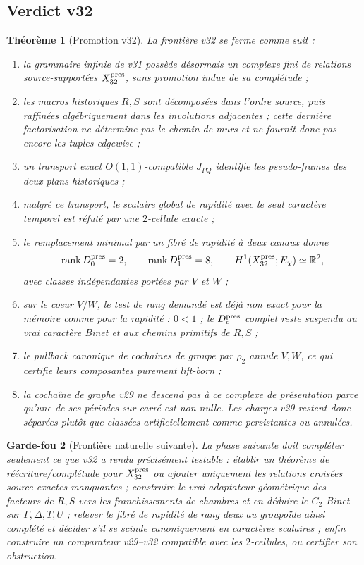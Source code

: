 \documentclass[11pt,a4paper]{article}
\newtheorem{theorem}{Théorème}[section]
\newtheorem{guardrail}[theorem]{Garde-fou}
\newcommand{\rank}{\operatorname{rank}}
\begin{document}
\subsection{Verdict v32}

\begin{theorem}[Promotion v32]\label{thm:v32-verdict}
La frontière v32 se ferme comme suit :
\begin{enumerate}[label=\textup{(\roman*)}]
\item la grammaire infinie de v31 possède désormais un complexe fini de relations source-supportées
$X_{32}^{\rm pres}$, sans promotion indue de sa complétude ;
\item les macros historiques $R,S$ sont décomposées dans l'ordre source, puis raffinées
algébriquement dans les involutions adjacentes ; cette dernière factorisation ne détermine pas le
chemin de murs et ne fournit donc pas encore les tuples edgewise ;
\item un transport exact $O(1,1)$-compatible $J_{PQ}$ identifie les pseudo-frames des deux plans
historiques ;
\item malgré ce transport, le scalaire global de rapidité avec le seul caractère temporel est
réfuté par une $2$-cellule exacte ;
\item le remplacement minimal par un fibré de rapidité à deux canaux donne
\[
 \rank D_0^{\rm pres}=2,\qquad
 \rank D_1^{\rm pres}=8,\qquad
 H^1(X_{32}^{\rm pres};E_\chi)\simeq\mathbb R^2,
\]
avec classes indépendantes portées par $V$ et $W$ ;
\item sur le coeur $V/W$, le test de rang demandé est déjà non exact pour la mémoire comme pour
la rapidité : $0<1$ ; le $D_c^{\rm pres}$ complet reste suspendu au vrai caractère Binet et aux
chemins primitifs de $R,S$ ;
\item le pullback canonique de cochaînes de groupe par $\rho_2$ annule $V,W$, ce qui certifie leurs
composantes purement lift-born ;
\item la cochaîne de graphe v29 ne descend pas à ce complexe de présentation parce qu'une de ses
périodes sur carré est non nulle. Les charges v29 restent donc séparées plutôt que classées
artificiellement comme persistantes ou annulées.
\end{enumerate}
\end{theorem}

\begin{guardrail}[Frontière naturelle suivante]
La phase suivante doit compléter seulement ce que v32 a rendu précisément testable : établir un
théorème de réécriture/complétude pour $X_{32}^{\rm pres}$ ou ajouter uniquement les relations
croisées source-exactes manquantes ; construire le vrai adaptateur géométrique des facteurs de
$R,S$ vers les franchissements de chambres et en déduire le $C_2$ Binet sur
$\Gamma,\Delta,T,U$ ; relever le fibré de rapidité de rang deux au groupoïde ainsi complété et
décider s'il se scinde canoniquement en caractères scalaires ; enfin construire un comparateur
v29--v32 compatible avec les $2$-cellules, ou certifier son obstruction.
\end{guardrail}
\end{document}
